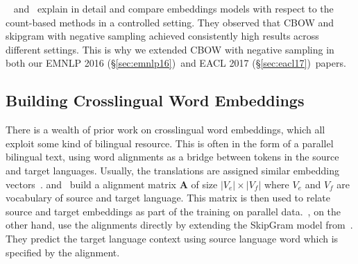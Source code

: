 \documentclass[12pt,twoside,final,hidelinks]{ltthesis}
\theoremstyle{definition}
\newcommand\emnlpvi{EMNLP 2016 (\S\ref{sec:emnlp16})}
\newcommand\eaclvii{EACL 2017 (\S\ref{sec:eacl17})}
\newcommand{\tofix}[1]{\hl{#1}}
\begin{document}
~ and~ explain in detail and compare embeddings models with respect to the count-based methods in a controlled setting. They observed that CBOW and skipgram with negative sampling achieved consistently high results across different settings. This is why we extended CBOW with negative sampling in both our \emnlpvi\ and \eaclvii\ papers. 



\subsection{Building Crosslingual Word Embeddings}
\label{sec:xlingualemb}
There is a wealth of prior work on crosslingual word embeddings, which all exploit some kind of bilingual resource.
This is often in the form of a parallel bilingual text, using word alignments as a bridge between tokens in the source and target languages. Usually, the translations are assigned similar embedding vectors~\cite{Luong-etal:naacl15:bivec,klementiev-titov-bhattarai:2012,zou-EtAl:2013:EMNLP}. 
 and~ build a alignment matrix $\textbf{A}$ of size $|V_e| \times |V_f|$ where $V_e$ and $V_f$ are vocabulary of source and target language. This matrix is then used to relate source and target embeddings as part of the training on parallel data.~, on the other hand, use the alignments directly by extending the SkipGram model from~. They predict the target language context using source language word which is specified by the alignment. 
\end{document}
